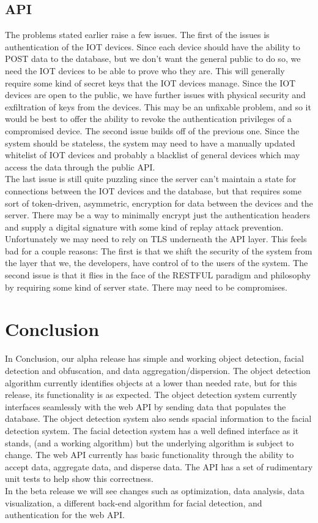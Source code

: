 \documentclass[onecolumn, draftclsnofoot,10pt, compsoc]{IEEEtran}
\begin{document}
\subsection{API}
The problems stated earlier raise a few issues. The first of the issues is authentication of the IOT devices. Since each device should have the ability to POST data to the database, but we don't want the general public to do so, we need the IOT devices to be able to prove who they are. This will generally require some kind of secret keys that the IOT devices manage. Since the IOT devices are open to the public, we have further issues with physical security and exfiltration of keys from the devices. This may be an unfixable problem, and so it would be best to offer the ability to revoke the authentication privileges of a compromised device. The second issue builds off of the previous one. Since the system should be stateless, the system may need to have a manually updated whitelist of IOT devices and probably a blacklist of general devices which may access the data through the public API.\\
The last issue is still quite puzzling since the server can't maintain a state for connections between the IOT devices and the database, but that requires some sort of token-driven, asymmetric, encryption for data between the devices and the server. There may be a way to minimally encrypt just the authentication headers and supply a digital signature with some kind of replay attack prevention. Unfortunately we may need to rely on TLS underneath the API layer. This feels bad for a couple reasons: The first is that we shift the security of the system from the layer that we, the developers, have control of to the users of the system. The second issue is that it flies in the face of the RESTFUL paradigm and philosophy by requiring some kind of server state. There may need to be compromises.

\section{Conclusion}
In Conclusion, our alpha release has simple and working object detection, facial detection and obfuscation, and data aggregation/dispersion. The object detection algorithm currently identifies objects at a lower than needed rate, but for this release, its functionality is as expected. The object detection system currently interfaces seamlessly with the web API by sending data that populates the database. The object detection system also sends spacial information to the facial detection system. The facial detection system has a well defined interface as it stands, (and a working algorithm) but the underlying algorithm is subject to change. The web API currently has basic functionality through the ability to accept data, aggregate data, and disperse data. The API has a set of rudimentary unit tests to help show this correctness.\\ 
In the beta release we will see changes such as optimization, data analysis, data visualization, a different back-end algorithm for facial detection, and authentication for the web API.
\end{document}
